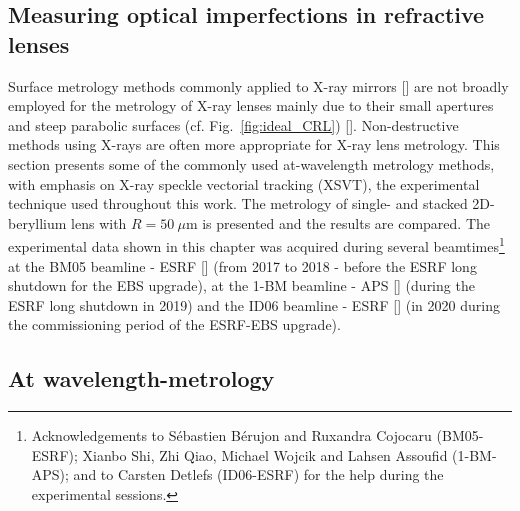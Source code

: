 
\begin{refsection}
\chapter{Measuring optical imperfections in refractive lenses}\label{sec:measuring}

Surface metrology methods commonly applied to X-ray mirrors [\cite{Alcock2016, Vivo2019}] are not broadly employed for the metrology of X-ray lenses mainly due to their small apertures and steep parabolic surfaces (cf. Fig.~\ref{fig:ideal_CRL}) [\cite{Lyatun2015}]. Non-destructive methods using X-rays are often more appropriate for X-ray lens metrology. This section presents some of the commonly used at-wavelength metrology methods, with emphasis on X-ray speckle vectorial tracking (XSVT), the experimental technique used throughout this work. The metrology of single- and stacked 2D-beryllium lens with $R=50~\mu$m is presented and the results are compared. The experimental data shown in this chapter was acquired during several beamtimes\footnote{Acknowledgements to Sébastien Bérujon and Ruxandra Cojocaru (BM05-ESRF); Xianbo Shi, Zhi Qiao, Michael Wojcik and Lahsen Assoufid (1-BM-APS); and to Carsten Detlefs (ID06-ESRF) for the help during the experimental sessions.} at the BM05 beamline - ESRF [\cite{Ziegler2004}] (from 2017 to 2018 - before the ESRF long shutdown for the EBS upgrade), at the 1-BM beamline - APS [\cite{Macrander2016}] (during the ESRF long shutdown in 2019) and the ID06 beamline - ESRF [\cite{Kutsal_2019}] (in 2020 during the commissioning period of the ESRF-EBS upgrade).


\section{At wavelength-metrology}\label{sec:at_wavelength}


\end{refsection}
